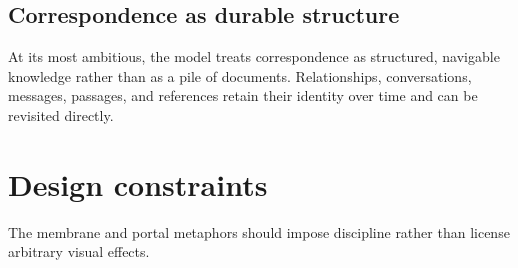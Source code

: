 \documentclass[11pt]{article}
\begin{document}
\subsection*{Correspondence as durable structure}
At its most ambitious, the model treats correspondence as structured, navigable knowledge rather than as a pile of documents. Relationships, conversations, messages, passages, and references retain their identity over time and can be revisited directly.

\section{Design constraints}

The membrane and portal metaphors should impose discipline rather than license arbitrary visual effects.
\end{document}
